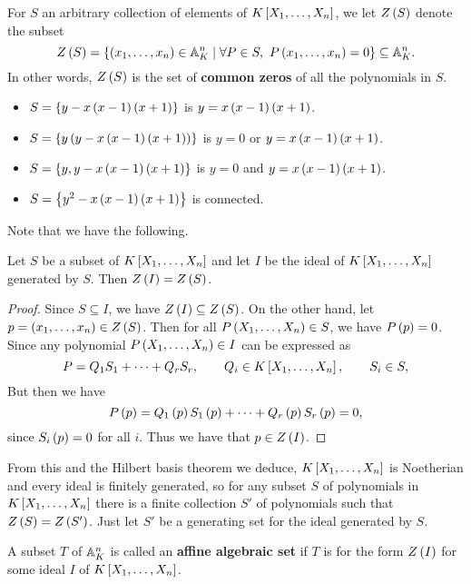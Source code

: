 For $ S $ an arbitrary collection of elements of $ K\sb{X_1, \dots, X_n} $, we let $ Z\rb{S} $ denote the subset
$$ Z\rb{S} = \cb{\rb{x_1, \dots, x_n} \in \A_K^n \mid \forall P \in S, \ P\rb{x_1, \dots, x_n} = 0} \subseteq \A_K^n. $$
In other words, $ Z\rb{S} $ is the set of \textbf{common zeros} of all the polynomials in $ S $.

\begin{example*}
\hfill
\begin{itemize}
\item $ S = \cb{y - x\rb{x - 1}\rb{x + 1}} $ is $ y = x\rb{x - 1}\rb{x + 1} $.
\item $ S = \cb{y\rb{y - x\rb{x - 1}\rb{x + 1}}} $ is $ y = 0 $ or $ y = x\rb{x - 1}\rb{x + 1} $.
\item $ S = \cb{y, y - x\rb{x - 1}\rb{x + 1}} $ is $ y = 0 $ and $ y = x\rb{x - 1}\rb{x + 1} $.
\item $ S = \cb{y^2 - x\rb{x - 1}\rb{x + 1}} $ is connected.
\end{itemize}
\end{example*}

Note that we have the following.

\begin{lemma}
Let $ S $ be a subset of $ K\sb{X_1, \dots, X_n} $ and let $ I $ be the ideal of $ K\sb{X_1, \dots, X_n} $ generated by $ S $. Then $ Z\rb{I} = Z\rb{S} $.
\end{lemma}

\begin{proof}
Since $ S \subseteq I $, we have $ Z\rb{I} \subseteq Z\rb{S} $. On the other hand, let $ p = \rb{x_1, \dots, x_n} \in Z\rb{S} $. Then for all $ P\rb{X_1, \dots, X_n} \in S $, we have $ P\rb{p} = 0 $. Since any polynomial $ P\rb{X_1, \dots, X_n} \in I $ can be expressed as
$$ P = Q_1S_1 + \dots + Q_rS_r, \qquad Q_i \in K\sb{X_1, \dots, X_n}, \qquad S_i \in S, $$
But then we have
$$ P\rb{p} = Q_1\rb{p}S_1\rb{p} + \dots + Q_r\rb{p}S_r\rb{p} = 0, $$
since $ S_i\rb{p} = 0 $ for all $ i $. Thus we have that $ p \in Z\rb{I} $.
\end{proof}

From this and the Hilbert basis theorem we deduce, $ K\sb{X_1, \dots, X_n} $ is Noetherian and every ideal is finitely generated, so for any subset $ S $ of polynomials in $ K\sb{X_1, \dots, X_n} $ there is a finite collection $ S' $ of polynomials such that $ Z\rb{S} = Z\rb{S'} $. Just let $ S' $ be a generating set for the ideal generated by $ S $.

\begin{definition}
A subset $ T $ of $ \A_K^n $ is called an \textbf{affine algebraic set} if $ T $ is for the form $ Z\rb{I} $ for some ideal $ I $ of $ K\sb{X_1, \dots, X_n} $.
\end{definition}

